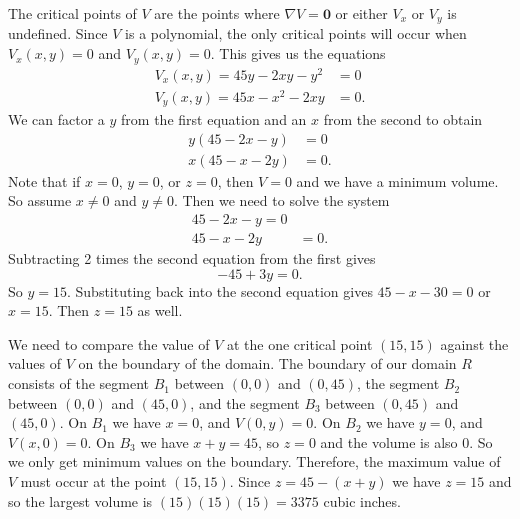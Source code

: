 \begin{exercises}
\begin{exerciseSolution}
	\item The critical points of $V$ are the points where $\nabla V = \mathbf{0}$ or either $V_x$ or $V_y$ is undefined. Since $V$ is a polynomial, the only critical points will occur when $V_x(x,y) = 0$ and $V_y(x,y) = 0$. This gives us the equations
\begin{align*}
V_x(x,y) = 45y - 2xy - y^2 &= 0 \\
V_y(x,y) = 45x - x^2 - 2xy &= 0.
\end{align*}
We can factor a $y$ from the first equation and an $x$ from the second to obtain
\begin{align*}
y(45-2x-y) &= 0 \\
x(45-x-2y) &= 0.
\end{align*}
Note that if $x=0$, $y = 0$, or $z = 0$, then $V = 0$ and we have a minimum volume. So assume $x \neq 0$ and $y \neq 0$. Then we need to solve the system
\begin{align*}
45 - 2x - y = 0 \\
45 - x - 2y &= 0.
\end{align*}
Subtracting 2 times the second equation from the first gives 
\[-45 + 3y = 0.\]
So $y = 15$. Substituting back into the second equation gives $45 - x - 30 = 0$ or $x = 15$. Then $z = 15$ as well.
 
	\item We need to compare the value of $V$ at the one critical point $(15,15)$ against the values of $V$ on the boundary of the domain. The boundary of our domain $R$ consists of the segment $B_1$ between $(0,0)$ and $(0,45)$, the segment $B_2$ between $(0,0)$ and $(45,0)$, and the segment $B_3$ between $(0,45)$ and $(45,0)$. On $B_1$ we have $x=0$, and $V(0,y)=0$. On $B_2$ we have $y=0$, and $V(x,0)=0$. On $B_3$ we have $x+y=45$, so $z=0$ and the volume is also 0. So we only get minimum values on the boundary. Therefore, the maximum value of $V$ must occur at the point $(15,15)$. Since $z = 45-(x+y)$ we have $z=15$ and so the largest volume is $(15)(15)(15) = 3375$ cubic inches. 

	\ea
\end{exerciseSolution}



\end{exercises}
